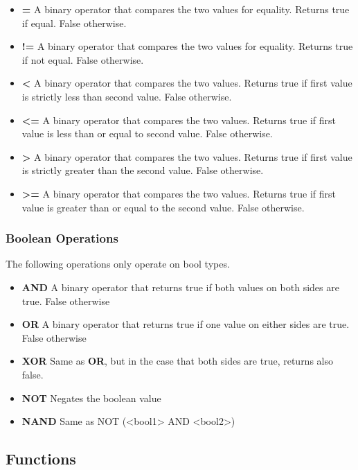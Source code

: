 \begin{itemize}
  \item \textbf{=} A binary operator that compares the two values for equality. Returns true if equal. False otherwise.
  \item \textbf{!=} A binary operator that compares the two values for equality. Returns true if not equal. False otherwise.
  \item \textbf{<} A binary operator that compares the two values. Returns true if first value is strictly less than second value. False otherwise.
  \item \textbf{<=} A binary operator that compares the two values. Returns true if first value is less than or equal to second value. False otherwise.
  \item \textbf{>} A binary operator that compares the two values. Returns true if first value is strictly greater than the second value. False otherwise.
  \item \textbf{>=} A binary operator that compares the two values. Returns true if first value is greater than or equal to the second value. False otherwise.
\end{itemize}

\subsubsection{Boolean Operations}
\label{sec:boolOps}

The following operations only operate on bool types.

\begin{itemize}
  \item \textbf{AND} A binary operator that returns true if both values on both sides are true. False otherwise
  \item \textbf{OR} A binary operator that returns true if one value on either sides are true. False otherwise
  \item \textbf{XOR} Same as \textbf{OR}, but in the case that both sides are true, returns also false.
  \item \textbf{NOT} Negates the boolean value
  \item \textbf{NAND} Same as NOT (<bool1> AND <bool2>)
\end{itemize}

\subsection{Functions}
\label{sec:functions}

